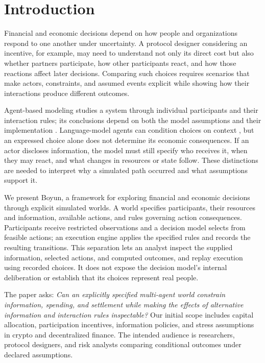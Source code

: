 \section{Introduction}\label{sec:introduction}
Financial and economic decisions depend on how people and organizations
respond to one another under uncertainty. A protocol designer considering an
incentive, for example, may need to understand not only its direct cost but
also whether partners participate, how other participants react, and how
those reactions affect later decisions. Comparing such choices requires
scenarios that make actors, constraints, and assumed events explicit while
showing how their interactions produce different outcomes.

Agent-based modeling studies a system through individual participants and
their interaction rules; its conclusions depend on both the model assumptions
and their implementation \cite{grimm2020,galan2009}. Language-model agents can
condition choices on context \cite{park2023,yang2025}, but an expressed choice
alone does not determine its economic consequences. If an actor discloses
information, the model must still specify who receives it, when they may react,
and what changes in resources or state follow. These distinctions are needed
to interpret why a simulated path occurred and what assumptions support it.

We present Boyun, a framework for exploring financial and economic decisions
through explicit simulated worlds. A world specifies participants, their
resources and information, available actions, and rules governing action
consequences. Participants receive restricted observations and a decision
model selects from feasible actions; an execution engine applies the specified
rules and records the resulting transitions. This separation lets an analyst
inspect the supplied information, selected actions, and computed outcomes,
and replay execution using recorded choices. It does not expose the decision
model's internal deliberation or establish that its choices represent real
people.

The paper asks: \emph{Can an explicitly specified multi-agent world constrain
information, spending, and settlement while making the effects of alternative
information and interaction rules inspectable?} Our initial scope includes
capital allocation, participation incentives, information policies, and stress
assumptions in crypto and decentralized finance. The intended audience is
researchers, protocol designers, and risk analysts comparing conditional
outcomes under declared assumptions.

